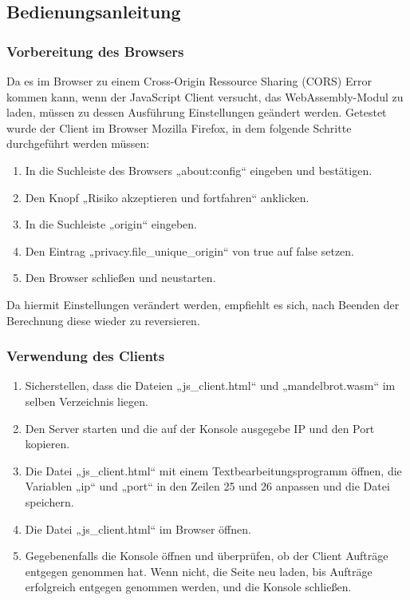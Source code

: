 \documentclass[12pt, onecolumn, notitlepage]{scrartcl}
\begin{document}
\subsection{Bedienungsanleitung}
\subsubsection{Vorbereitung des Browsers}
Da es im Browser zu einem Cross-Origin Ressource Sharing (CORS) Error kommen kann, wenn der JavaScript Client versucht, das WebAssembly-Modul zu laden, müssen zu dessen Ausführung Einstellungen geändert werden. Getestet wurde der Client im Browser Mozilla Firefox, in dem folgende Schritte durchgeführt werden müssen:
\begin{enumerate}
	\setlength\itemsep{0.07em}
	\item In die Suchleiste des Browsers „about:config“ eingeben und bestätigen.
	\item Den Knopf „Risiko akzeptieren und fortfahren“ anklicken.
	\item In die Suchleiste „origin“ eingeben.
	\item Den Eintrag „privacy.file\_unique\_origin“ von true auf false setzen.
	\item Den Browser schließen und neustarten.
\end{enumerate}
Da hiermit Einstellungen verändert werden, empfiehlt es sich, nach Beenden der Berechnung diese wieder zu reversieren.
\subsubsection{Verwendung des Clients}
\begin{enumerate}
	\setlength\itemsep{0.07em}
	\item Sicherstellen, dass die Dateien „js\_client.html“ und „mandelbrot.wasm“ im selben Verzeichnis liegen.
	\item Den Server starten und die auf der Konsole ausgegebe IP und den Port kopieren.
	\item Die Datei „js\_client.html“ mit einem Textbearbeitungsprogramm öffnen, die Variablen „ip“ und „port“ in den Zeilen 25 und 26 anpassen und die Datei speichern.
	\item Die Datei „js\_client.html“ im Browser öffnen.
	\item Gegebenenfalls die Konsole öffnen und überprüfen, ob der Client Aufträge entgegen genommen hat. Wenn nicht, die Seite neu laden, bis Aufträge erfolgreich entgegen genommen werden, und die Konsole schließen.
\end{enumerate}
\end{document}
